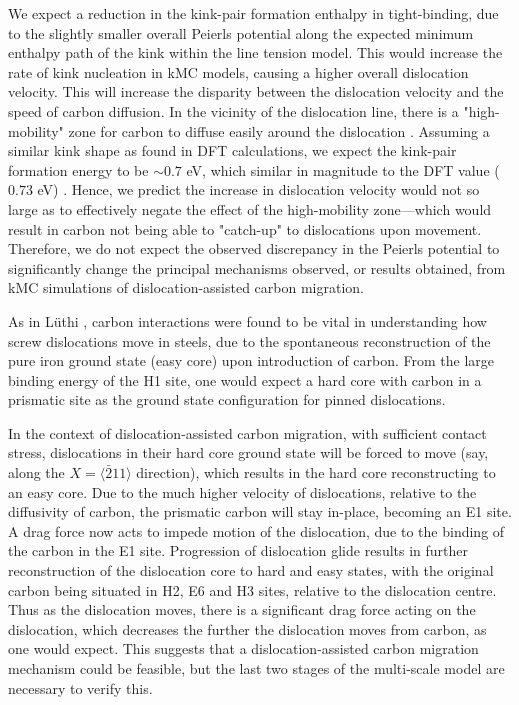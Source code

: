 \documentclass[a4paper,11pt]{article}
\begin{document}
We expect a reduction in the kink-pair formation enthalpy in tight-binding, due to
the slightly smaller overall Peierls potential along the expected minimum enthalpy
path of the kink within the line tension model. This would increase
the rate of kink nucleation in kMC models, causing a higher overall dislocation
velocity. This will increase the disparity between the dislocation velocity and
the speed of carbon diffusion. In the vicinity of the dislocation line, there is a
"high-mobility" zone for carbon to diffuse easily around the dislocation
\cite{Nematollahi2016}. Assuming a similar kink shape as found in DFT calculations,
we expect the kink-pair formation energy to be \(\sim 0.7\) eV, which similar in
magnitude to the DFT value (\(0.73\) eV) \cite{Itakura2012}. Hence, we predict the
increase in dislocation velocity would not so large as to effectively negate the
effect of the high-mobility zone---which would result in carbon not being able to
"catch-up" to dislocations upon movement. Therefore, we do not expect the observed
discrepancy in the Peierls potential to significantly change the principal
mechanisms observed, or results obtained, from kMC simulations of
dislocation-assisted carbon migration.



As in Lüthi \cite{Lthi2019}, carbon interactions were found to be vital in understanding how screw
dislocations move in steels, due to the spontaneous reconstruction of the pure iron ground state
(easy core) upon introduction of carbon. From the large binding energy of the H1 site, one would
expect a hard core with carbon in a prismatic site as the ground state configuration for pinned
dislocations.

In the context of dislocation-assisted carbon migration, with sufficient contact stress,
dislocations in their hard core ground state will be forced to move (say, along the \(X =
    \langle\bar{2}11\rangle\) direction), which results in the hard core reconstructing to an easy core. Due to
the much higher velocity of dislocations, relative to the diffusivity of carbon, the
prismatic carbon will stay in-place, becoming an E1 site. A drag force now acts to impede motion of the
dislocation, due to the binding of the carbon in the E1 site. Progression of dislocation glide
results in further reconstruction of the dislocation core to hard and easy states, with the
original carbon being situated in H2, E6 and H3 sites, relative to the dislocation
centre. Thus as the dislocation moves, there is a significant drag force acting on the
dislocation, which decreases the further the dislocation moves from carbon, as one would
expect. This suggests that a dislocation-assisted carbon migration mechanism could be feasible,
but the last two stages of the multi-scale model are necessary to verify this.
\end{document}

